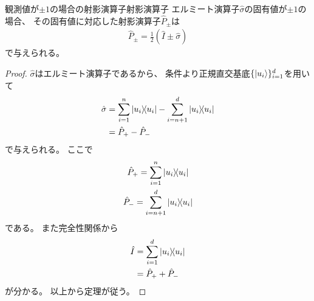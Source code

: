 \documentclass[a4paper, 10pt]{jsarticle}
\begin{document}
\begin{thm}{観測値が$\pm 1$の場合の射影演算子}{射影演算子}
	エルミート演算子$\hat{\sigma}$の固有値が$\pm 1$の場合、
	その固有値に対応した射影演算子$\hat{P}_{\pm}$は
	\begin{gather}
		\hat{P}_{\pm} = \frac{1}{2} \left( \hat{I} \pm \hat{\sigma} \right)
	\end{gather}
	で与えられる。
\end{thm}
\begin{proof}
	$\hat{\sigma}$はエルミート演算子であるから、
	条件より正規直交基底$\{ \Ket{u_i} \}_{i=1}^d$を用いて
	\begin{align}
		\hat{\sigma} &= \sum_{i=1}^n \Ket{u_i} \! \! \Bra{u_i}
		- \sum_{i=n+1}^d \Ket{u_i} \! \! \Bra{u_i} \\
		&= \hat{P}_+ - \hat{P}_-
	\end{align}
	で与えられる。
	ここで
	\begin{gather}
		\hat{P}_+ = \sum_{i=1}^n \Ket{u_i} \! \! \Bra{u_i} \\
		\hat{P}_- = \sum_{i=n+1}^d \Ket{u_i} \! \! \Bra{u_i}
	\end{gather}
	である。
	また完全性関係から
	\begin{align}
		\hat{I} &= \sum_{i=1}^d \Ket{u_i} \! \! \Bra{u_i} \\
		&= \hat{P}_+ + \hat{P}_-
	\end{align}
	が分かる。
	以上から定理が従う。
\end{proof}
\end{document}
